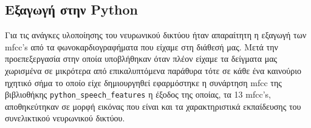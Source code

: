 \subsection{Eξαγωγή στην Python}
Για τις ανάγκες υλοποίησης του νευρωνικού δικτύου ήταν απαραίτητη η εξαγωγή των
mfcc's από τα φωνοκαρδιογραφήματα  που είχαμε στη διάθεσή μας. Μετά την
προεπεξεργασία στην οποία υποβλήθηκαν όταν πλέον είχαμε τα δείγματα μας
χωρισμένα σε μικρότερα από επικαλυπτόμενα παράθυρα τότε σε κάθε ένα καινούριο
ηχητικό σήμα το οποίο είχε δημιουργηθεί εφαρμόστηκε η συνάρτηση mfcc της
βιβλιοθήκης \verb|python_speech_features| η έξοδος της οποίας, τα 13 mfcc's,
αποθηκεύτηκαν σε μορφή εικόνας που είναι και τα χαρακτηριστικά εκπαίδευσης  του
συνελικτικού νευρωνικού δικτύου.
